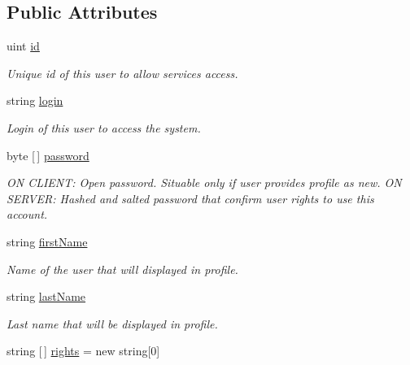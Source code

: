 \subsection*{Public Attributes}
\begin{DoxyCompactItemize}
\item 
uint \mbox{\hyperlink{class_authority_controller_1_1_data_1_1_personal_1_1_user_a1a2ed2d1d844d6c92cc301595488375a}{id}}
\begin{DoxyCompactList}\small\item\em Unique id of this user to allow services access. \end{DoxyCompactList}\item 
string \mbox{\hyperlink{class_authority_controller_1_1_data_1_1_personal_1_1_user_aa0cd14927a55efeafd187ca681bfd62d}{login}}
\begin{DoxyCompactList}\small\item\em Login of this user to access the system. \end{DoxyCompactList}\item 
byte \mbox{[}$\,$\mbox{]} \mbox{\hyperlink{class_authority_controller_1_1_data_1_1_personal_1_1_user_abc14acc6d3441deb742264eb6cfc167c}{password}}
\begin{DoxyCompactList}\small\item\em ON C\+L\+I\+E\+NT\+: Open password. Situable only if user provides profile as new. ON S\+E\+R\+V\+ER\+: Hashed and salted password that confirm user rights to use this account. \end{DoxyCompactList}\item 
string \mbox{\hyperlink{class_authority_controller_1_1_data_1_1_personal_1_1_user_a06913d22f1b4518cce99c356bdad38a0}{first\+Name}}
\begin{DoxyCompactList}\small\item\em Name of the user that will displayed in profile. \end{DoxyCompactList}\item 
string \mbox{\hyperlink{class_authority_controller_1_1_data_1_1_personal_1_1_user_ac845744a6958089f44f79f3a1d9341d1}{last\+Name}}
\begin{DoxyCompactList}\small\item\em Last name that will be displayed in profile. \end{DoxyCompactList}\item 
string \mbox{[}$\,$\mbox{]} \mbox{\hyperlink{class_authority_controller_1_1_data_1_1_personal_1_1_user_a937c23d9fddf843c49a69a6424bfda02}{rights}} = new string\mbox{[}0\mbox{]}

\end{DoxyCompactItemize}
